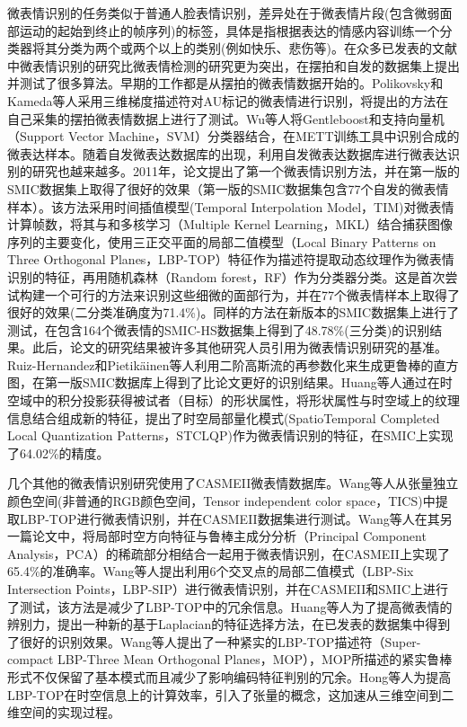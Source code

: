 微表情识别的任务类似于普通人脸表情识别，差异处在于微表情片段(包含微弱面部运动的起始到终止的帧序列)的标签，具体是指根据表达的情感内容训练一个分类器将其分类为两个或两个以上的类别(例如快乐、悲伤等)。在众多已发表的文献中微表情识别的研究比微表情检测的研究更为突出，在摆拍和自发的数据集上提出并测试了很多算法。早期的工作都是从摆拍的微表情数据开始的。Polikovsky和Kameda等人采用三维梯度描述符对AU标记的微表情进行识别，将提出的方法在自己采集的摆拍微表情数据上进行了测试\citep{Polikovsky2013Facial}。Wu等人将Gentleboost和支持向量机（Support Vector Machine，SVM）分类器结合，在METT训练工具中识别合成的微表达样本。随着自发微表达数据库的出现，利用自发微表达数据库进行微表达识别的研究也越来越多。2011年，论文提出了第一个微表情识别方法，并在第一版的SMIC数据集上取得了很好的效果（第一版的SMIC数据集包含77个自发的微表情样本）。该方法采用时间插值模型(Temporal Interpolation Model，TIM)对微表情计算帧数，将其与和多核学习（Multiple Kernel Learning，MKL）结合捕获图像序列的主要变化，使用三正交平面的局部二值模型（Local Binary Patterns on Three Orthogonal Planes，LBP-TOP）特征作为描述符提取动态纹理作为微表情识别的特征，再用随机森林（Random forest，RF）作为分类器分类。这是首次尝试构建一个可行的方法来识别这些细微的面部行为，并在77个微表情样本上取得了很好的效果(二分类准确度为71.4\%)。同样的方法在新版本的SMIC数据集上进行了测试，在包含164个微表情的SMIC-HS数据集上得到了48.78\%(三分类)的识别结果。此后，论文的研究结果被许多其他研究人员引用为微表情识别研究的基准。Ruiz-Hernandez和Pietikäinen等人利用二阶高斯流的再参数化来生成更鲁棒的直方图，在第一版SMIC数据库上得到了比论文更好的识别结果\citep{ruiz2013encoding}。Huang等人通过在时空域中的积分投影获得被试者（目标）的形状属性，将形状属性与时空域上的纹理信息结合组成新的特征，提出了时空局部量化模式(SpatioTemporal Completed Local Quantization Patterns，STCLQP)作为微表情识别的特征，在SMIC上实现了64.02\%的精度\citep{Huang2015Facial}。

几个其他的微表情识别研究使用了CASMEII微表情数据库。Wang等人从张量独立颜色空间(非普通的RGB颜色空间，Tensor independent color space，TICS)中提取LBP-TOP进行微表情识别，并在CASMEII数据集进行测试\citep{wang2014micro2}。Wang等人在其另一篇论文中，将局部时空方向特征与鲁棒主成分分析（Principal Component Analysis，PCA）的稀疏部分相结合一起用于微表情识别，在CASMEII上实现了65.4\%的准确率\citep{wang2014micro}。Wang等人提出利用6个交叉点的局部二值模式（LBP-Six Intersection Points，LBP-SIP）进行微表情识别，并在CASMEII和SMIC上进行了测试，该方法是减少了LBP-TOP中的冗余信息\citep{wang2014lbp}。Huang等人为了提高微表情的辨别力，提出一种新的基于Laplacian的特征选择方法，在已发表的数据集中得到了很好的识别效果\citep{xiaohua2017discriminative}。Wang等人提出了一种紧实的LBP-TOP描述符（Super-compact LBP-Three Mean Orthogonal Planes，MOP），MOP所描述的紧实鲁棒形式不仅保留了基本模式而且减少了影响编码特征判别的冗余\citep{wang2015efficient}。Hong等人为提高LBP-TOP在时空信息上的计算效率，引入了张量的概念，这加速从三维空间到二维空间的实现过程\citep{FLBPTOP_2016}。

